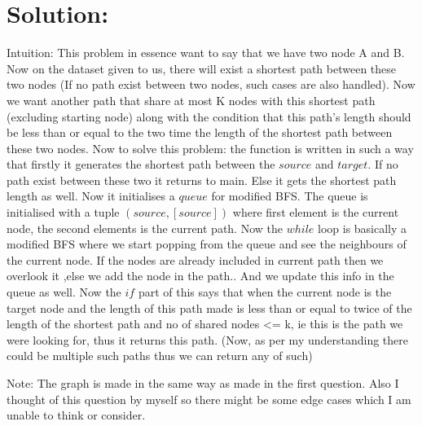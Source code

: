 \documentclass{article}
\begin{document}
\section{Solution:}
Intuition:\newline
This problem in essence want to say that we have two node A and B. Now on the dataset given to us, there will exist a shortest path between these two nodes (If no path exist between two nodes, such cases are also handled). Now we want another path that share at most K nodes with this shortest path (excluding starting node) along with the condition that this path's length should be less than or equal to the two time the length of the shortest path between these two nodes. \newline
Now to solve this problem: the function is written in such a way that firstly it generates the shortest path between the $source$ and $target$. If no path exist between these two it returns to main. Else it gets the shortest path length as well.  
Now it initialises a $queue$ for modified BFS. The queue is initialised with a tuple $(source,[source])$ where first element is the current node, the second elements is the current path. 
Now the $while$ loop is basically a modified BFS where we start popping from the queue and see the neighbours of the current node. If the nodes are already included in current path then we overlook it ,else we add the node in the path..\newline
And we update this info in the queue as well.
Now the $if$ part of this says that when the current node is the target node and the length of this path made is less than or equal to twice of the length of the shortest path and no of shared nodes <= k, ie this is the path we were looking for, thus it returns this path. (Now, as per my understanding there could be multiple such paths thus we can return any of such)

Note: The graph is made in the same way as made in the first question.
Also I thought of this question by myself so there might be some edge cases which I am unable to think or consider.
\end{document}
